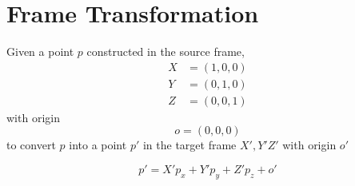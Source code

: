 \chapter{Frame Transformation}

  Given a point $ p $ constructed in the source frame,
  \begin{align*}
    X &= \left( 1, 0, 0 \right) \\
    Y &= \left( 0, 1, 0 \right) \\
    Z &= \left( 0, 0, 1 \right)
  \end{align*}
  with origin
  \begin{equation*}
    o = \left( 0, 0, 0 \right)
  \end{equation*}
  to convert $ p $ into a point $ p' $ in the target frame $ X', Y' Z' $
  with origin $ o' $

  \begin{equation}
    p' = X' p_{x} + Y' p_{y} + Z' p_{z} + o'
  \end{equation}
